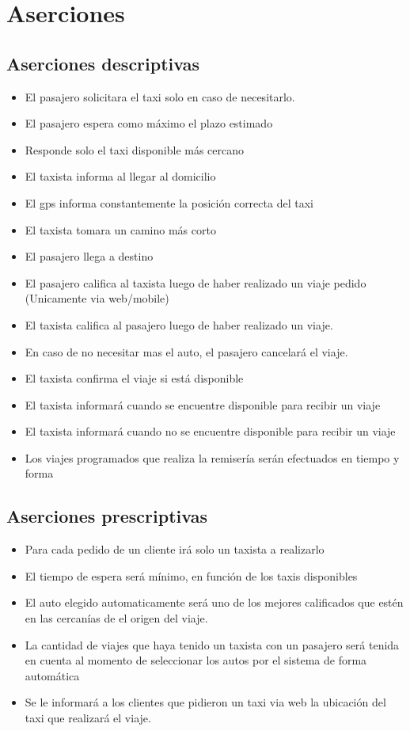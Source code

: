 \documentclass[a4paper]{article}
\begin{document}
\section{Aserciones}

\subsection{Aserciones descriptivas}

\begin{itemize}

\item El pasajero solicitara el taxi solo en caso de necesitarlo.
\item El pasajero espera como m\'aximo el plazo estimado
\item Responde solo el taxi disponible m\'as cercano
\item El taxista informa al llegar al domicilio
\item El gps informa constantemente la posici\'on correcta del taxi
\item El taxista tomara un camino m\'as corto
\item El pasajero llega a destino
\item El pasajero califica al taxista luego de haber realizado un viaje pedido (Unicamente via web/mobile)
\item El taxista califica al pasajero luego de haber realizado un viaje.
\item En caso de no necesitar mas el auto, el pasajero cancelar\'a el viaje.
\item El taxista confirma el viaje si est\'a disponible
\item El taxista informar\'a cuando se encuentre disponible para recibir un viaje
\item El taxista informar\'a cuando no se encuentre disponible para recibir un viaje
\item Los viajes programados que realiza la remiser\'ia ser\'an efectuados en tiempo y forma
\end{itemize}


\subsection{Aserciones prescriptivas}

\begin{itemize}
\item Para cada pedido de un cliente ir\'a solo un taxista a realizarlo
\item El tiempo de espera ser\'a m\'inimo, en funci\'on de los taxis disponibles
\item El auto elegido automaticamente ser\'a uno de los mejores calificados que est\'en en las cercan\'ias de el origen del viaje.
\item La cantidad de viajes que haya tenido un taxista con un pasajero ser\'a tenida en cuenta al momento de seleccionar los autos por el sistema de forma autom\'atica
\item Se le informar\'a a los clientes que pidieron un taxi via web la ubicaci\'on del taxi que realizar\'a el viaje.
 
\end{itemize}
\end{document}
